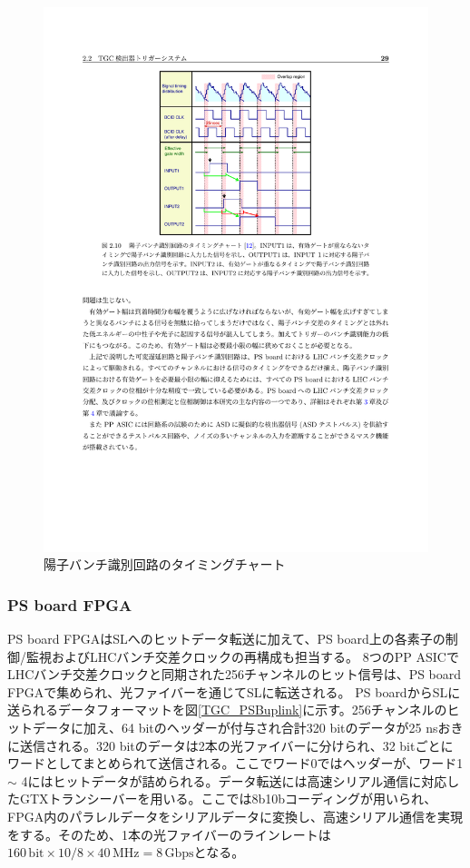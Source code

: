     \begin{figure} 
    \centering
    \includegraphics[width=16cm]{fig/Intro/TGC_BCID.pdf}
    \caption[陽子バンチ識別回路のタイミングチャート]{陽子バンチ識別回路のタイミングチャート\cite{mt_takemoto}}
    \label{TGC_BCID}
    \end{figure}

    \subsubsection*{PS board FPGA}

    PS board FPGAはSLへのヒットデータ転送に加えて、PS board上の各素子の制御/監視およびLHCバンチ交差クロックの再構成も担当する。
    8つのPP ASICでLHCバンチ交差クロックと同期された256チャンネルのヒット信号は、PS board FPGAで集められ、光ファイバーを通じてSLに転送される。
    PS boardからSLに送られるデータフォーマットを図\ref{TGC_PSBuplink}に示す。256チャンネルのヒットデータに加え、64 bitのヘッダーが付与され合計320 bitのデータが25 nsおきに送信される。320 bitのデータは2本の光ファイバーに分けられ、32 bitごとにワードとしてまとめられて送信される。ここでワード0ではヘッダーが、ワード1 $\sim$ 4にはヒットデータが詰められる。データ転送には高速シリアル通信に対応したGTXトランシーバーを用いる。ここでは8b10bコーディングが用いられ、FPGA内のパラレルデータをシリアルデータに変換し、高速シリアル通信を実現をする。そのため、1本の光ファイバーのラインレートは$160 \, \mathrm{bit} \times 10/8 \times 40 \mathrm{\,MHz} = 8 \,\mathrm{Gbps}$となる。

